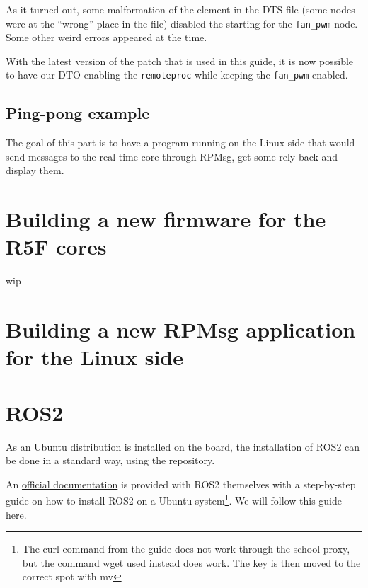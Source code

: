 \documentclass[10pt]{article}
\begin{document}
As it turned out, some malformation of the element in the DTS file (some nodes were
at the ``wrong'' place in the file) disabled the starting for the \verb|fan_pwm|
node. Some other weird errors appeared at the time.

With the latest version of the patch that is used in this guide, it is now
possible to have our DTO enabling the \verb|remoteproc| while keeping
the \verb|fan_pwm| enabled.




\subsection{Ping-pong example}
\label{sec:ping-pong-example}
The goal of this part is to have a program running on the Linux side that would
send messages to the real-time core through RPMsg, get some rely back and display
them.



\section{Building a new firmware for the R5F cores}
\label{sec:build-new-firmw}
wip

\section{Building a new RPMsg application for the Linux side}
\label{sec:building-new-rpmsg}






\section{ROS2}
\label{sec:ros2}
As an Ubuntu distribution is installed on the board, the installation of ROS2 can be done
in a standard way, using the repository.

An \href{https://docs.ros.org/en/humble/Installation/Ubuntu-Install-Debians.html}{official documentation}
is provided with ROS2 themselves with a step-by-step guide on how to install
ROS2 on a Ubuntu system\footnote{The curl command from the guide does not work through the school proxy,
  but the command wget used instead does work. The key is then moved to the correct spot with mv}.
We will follow this guide here.
\end{document}
